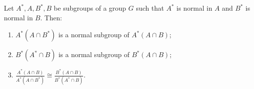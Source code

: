 Let $A^*, A, B^*, B$ be subgroups of a group $G$ such that $A^*$ is normal in $A$ and $B^*$ is normal in $B$. Then:
\begin{enumerate}
\item[(i)] $A^*(A \cap B^*)$ is a normal subgroup of $A^*(A \cap B)$;
\item[(ii)] $B^*(A^* \cap B)$ is a normal subgroup of $B^*(A \cap B)$;
\item[(iii)] $\displaystyle \frac{A^*(A \cap B)}{A^*(A \cap B^*)} \cong \frac{B^*(A \cap B)}{B^*(A^* \cap B)}$.
\end{enumerate}
